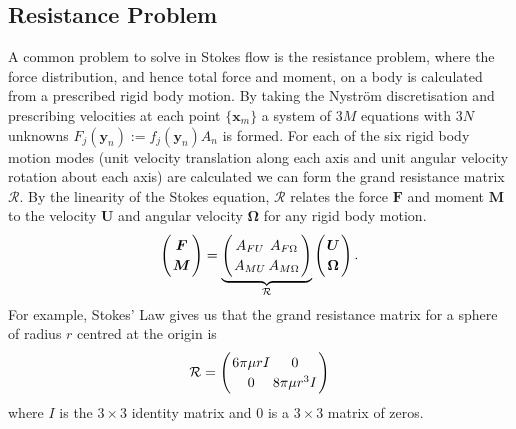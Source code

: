 \subsection{Resistance Problem} \label{sec:resistance}
A common problem to solve in Stokes flow is the resistance problem, where the force distribution, and hence total force and moment, on a body is calculated from a prescribed rigid body motion. By taking the Nyström discretisation
and prescribing velocities at each point $\{\bm{x}_m\}$ a system of $3M$ equations with $3N$ unknowns $F_j(\bm{y}_n) := f_j(\bm{y}_n)A_n$ is formed. For each of the six rigid body motion modes (unit velocity translation along each axis and unit angular velocity rotation about each axis) are calculated we can form the grand resistance matrix $\mathcal{R}$\cite{Pozrikidis1992BoundaryFlow}. By the linearity of the Stokes equation, $\mathcal{R}$ relates the force $\mathbf{F}$ and moment $\mathbf{M}$ to the velocity $\mathbf{U}$ and angular velocity $\mathbf{\Omega}$ for any rigid body motion. 
\begin{equation}
\arraycolsep=1pt\def\arraystretch{1.2}
\left(
\begin{array}{c}
\boldsymbol{F} \\
\boldsymbol{M}
\end{array}\right)=\underbrace{\left(\begin{array}{cc}
A_{F U} & A_{F \Omega} \\
A_{M U} & A_{M \Omega}
\end{array}\right)}_{\mathcal{R}}\left(\begin{array}{c}
\boldsymbol{U} \\
\boldsymbol{\Omega}
\end{array}\right) .
\label{eq:GrandResistance}
\end{equation}
 For example, Stokes' Law gives us that the grand resistance matrix for a sphere of radius $r$ centred at the origin is
 \begin{equation}
\arraycolsep=1pt\def\arraystretch{1.2}
\mathcal{R}=\left(\begin{array}{cc}
6\pi\mu r I & 0 \\
0 & 8\pi\mu r^3 I
\end{array}\right)
\label{eq:sphereres}
\end{equation}
where $I$ is the $3\times 3$ identity matrix and $0$ is a $3\times 3$ matrix of zeros.

